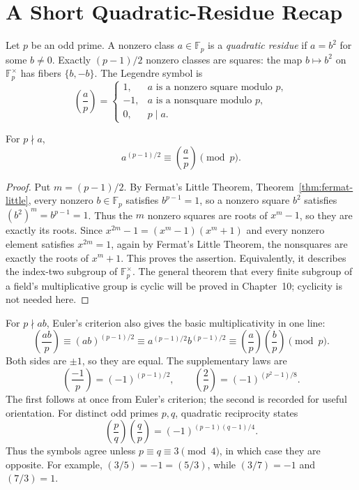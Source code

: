 \section{A Short Quadratic-Residue Recap}
Let \(p\) be an odd prime.  A nonzero class \(a\in\mathbb F_p\) is a
\emph{quadratic residue} if \(a=b^2\) for some \(b\ne0\).  Exactly
\((p-1)/2\) nonzero classes are squares: the map \(b\mapsto b^2\) on
\(\mathbb F_p^\times\) has fibers \(\{b,-b\}\).  The Legendre symbol is
\[
\left(\frac ap\right)=
\begin{cases}1,&a\text{ is a nonzero square modulo }p,\\-1,&a\text{ is a nonsquare modulo }p,\\0,&p\mid a.\end{cases}
\]

\begin{theorem}
For \(p\nmid a\),
\[
a^{(p-1)/2}\equiv\left(\frac ap\right)\pmod p.
\]
\end{theorem}
\begin{proof}
Put \(m=(p-1)/2\). By Fermat's Little Theorem,
Theorem~\ref{thm:fermat-little}, every nonzero \(b\in\mathbb F_p\) satisfies
\(b^{p-1}=1\), so a nonzero square \(b^2\) satisfies
\((b^2)^m=b^{p-1}=1\). Thus the \(m\) nonzero squares are roots of
\(x^m-1\), so
they are exactly its roots.  Since \(x^{2m}-1=(x^m-1)(x^m+1)\) and every
nonzero element satisfies \(x^{2m}=1\), again by Fermat's Little Theorem,
the nonsquares are exactly the roots
of \(x^m+1\). This proves the assertion. Equivalently, it describes the
index-two subgroup of \(\mathbb F_p^\times\). The general theorem that every
finite subgroup of a field's multiplicative group is cyclic will be proved
in Chapter~10; cyclicity is not needed here.
\end{proof}
For \(p\nmid ab\), Euler's criterion also gives the basic multiplicativity
in one line:
\[
\left(\frac{ab}{p}\right)
\equiv(ab)^{(p-1)/2}
\equiv a^{(p-1)/2}b^{(p-1)/2}
\equiv\left(\frac ap\right)\left(\frac bp\right)\pmod p.
\]
Both sides are \(\pm1\), so they are equal.
The supplementary laws are
\[
\left(\frac{-1}{p}\right)=(-1)^{(p-1)/2},\qquad
\left(\frac2p\right)=(-1)^{(p^2-1)/8}.
\]
The first follows at once from Euler's criterion; the second is recorded for
useful orientation.  For distinct odd primes \(p,q\), quadratic reciprocity
states
\[
\left(\frac pq\right)\left(\frac qp\right)
=(-1)^{(p-1)(q-1)/4}.
\]
Thus the symbols agree unless \(p\equiv q\equiv3\pmod4\), in which case they
are opposite.  For example, \((3/5)=-1=(5/3)\), while
\((3/7)=-1\) and \((7/3)=1\).

